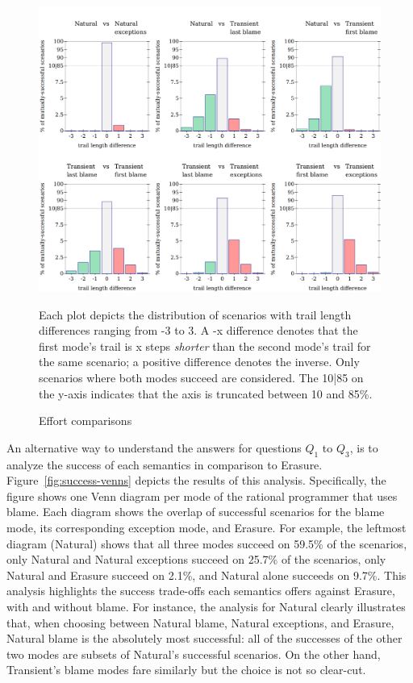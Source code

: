 \begin{figure}\footnotesize \centering
  \includegraphics[width=\textwidth]{./plots/bt-length-comparisons}

  \vspace{1em}
  \begin{minipage}{0.95\textwidth}

    Each plot depicts the distribution of scenarios with trail length
    differences ranging from -3 to 3.  A -x difference denotes that the first
    mode's trail is x steps {\em shorter\/} than the second mode's trail for the
    same scenario; a positive difference denotes the inverse.  Only
    scenarios where both modes succeed are considered.  The 10|85 on the y-axis
    indicates that the axis is truncated between 10 and 85\%.

  \end{minipage}

  \caption{Effort comparisons} \label{fig:effort-comparisons}
\end{figure}

An alternative way to understand the answers for questions $Q_1$ to $Q_3$, is to
analyze the success of each semantics in comparison to
Erasure. Figure~\ref{fig:success-venns} depicts the results of this analysis.
Specifically, the figure shows one Venn diagram per mode of the rational
programmer that uses blame.  Each diagram shows the overlap of successful
scenarios for the blame mode, its corresponding exception mode, and Erasure.
For example, the leftmost diagram (Natural) shows that all three modes succeed
on 59.5\% of the scenarios, only Natural and Natural exceptions succeed on
25.7\% of the scenarios, only Natural and Erasure succeed on 2.1\%, and Natural
alone succeeds on 9.7\%.  This analysis highlights the success trade-offs each
semantics offers against Erasure, with and without blame. For instance, the
analysis for Natural clearly illustrates that, when choosing between Natural
blame, Natural exceptions, and Erasure, Natural blame is the absolutely most
successful: all of the successes of the other two modes are subsets of Natural's
successful scenarios.  On the other hand, Transient's blame modes fare similarly
but the choice is not so clear-cut.

